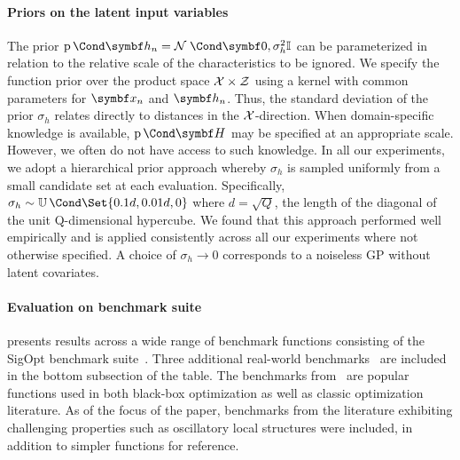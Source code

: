 \paragraph{Priors on the latent input variables}
The prior $\Prob{\mat{h}_n} = \Gaussian{\mat{0}, \sigma_h^2\mathbb{I}}$ can be parameterized in relation to the relative scale of the characteristics to be ignored.
We specify the function prior over the product space $\mathcal{X} \times \mathcal{Z}$ using a kernel with common parameters for $\mat{x}_n$ and $\mat{h}_n$.
Thus, the standard deviation of the prior $\sigma_h$ relates directly to distances in the $\mathcal{X}$-direction.
When domain-specific knowledge is available, $\Prob{\mat{H}}$ may be specified at an appropriate scale.
However, we often do not have access to such knowledge.
In all our experiments, we adopt a hierarchical prior approach whereby $\sigma_h$ is sampled uniformly from a small candidate set at each evaluation.
Specifically, $\sigma_h \sim \Uniform{\Set{0.1 d, 0.01 d, 0}}$ where $d = \sqrt{Q}$, the length of the diagonal of the unit Q-dimensional hypercube.
We found that this approach performed well empirically and is applied consistently across all our experiments where not otherwise specified.
A choice of $\sigma_h \to 0$ corresponds to a noiseless GP without latent covariates.

\paragraph{Evaluation on benchmark suite}
 presents results across a wide range of benchmark functions consisting of the SigOpt benchmark suite~\parencite{mccourt_optimization_2016}.
Three additional real-world benchmarks~\parencite{head_scikit-optimize_2018,malkomes_automating_2018,kaelbling_learning_2017} are included in the bottom subsection of the table.
The benchmarks from~\parencite{mccourt_optimization_2016} are popular functions used in both black-box optimization as well as classic optimization literature.
As of the focus of the paper, benchmarks from the literature exhibiting challenging properties such as oscillatory local structures were included,
in addition to simpler functions for reference.

